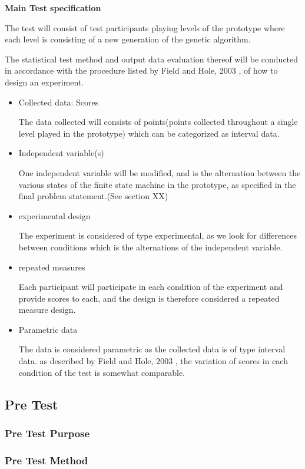 \newpage
\textbf{Main Test specification}

The test will consist of test participants playing levels of the prototype where each level is consisting of a new generation of the genetic algorithm.

The statistical test method and output data evaluation thereof will be conducted in accordance with the procedure listed by Field and Hole, 2003 \cite[pp. 265-277]{Field2003}, of how to design an experiment.

\begin{itemize}
\item Collected data: Scores

The data collected will consists of points(points collected throughout a single level played in the prototype) which can be categorized as interval data.
\item Independent variable(s)

One independent variable will be modified, and is the alternation between the various states of the finite state machine in the prototype, as specified in the final problem statement.(See section XX)
\item experimental design

The experiment is considered of type experimental, as we look for differences between conditions which is the alternations of the independent variable.
\item repeated measures

Each participant will participate in each condition of the experiment and provide scores to each, and the design is therefore considered a repeated measure design.
\item Parametric data

The data is considered parametric as the collected data is of type interval data. as described by Field and Hole, 2003 \cite[pp. 269]{Field2003}, the variation of scores in each condition of the test is somewhat comparable.

\end{itemize}


\subsection{Pre Test}

\subsubsection{Pre Test Purpose}
\subsubsection{Pre Test Method}
